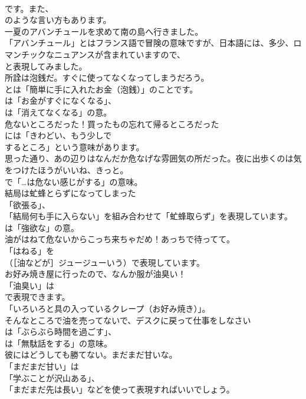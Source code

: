 \documentclass[8pt]{extreport}
\begin{document}
\begin{CJK}{UTF8}{min}
\\	です。また、
\\	のような言い方もあります。	
\\	一夏のアバンチュールを求めて南の島へ行きました。 
\\	「アバンチュール」とはフランス語で冒険の意味ですが、日本語には、多少、ロマンチックなニュアンスが含まれていますので、
\\	と表現してみました。	
\\	所詮は泡銭だ。すぐに使ってなくなってしまうだろう。 
\\	とは「簡単に手に入れたお金（泡銭）」のことです。
\\	は「お金がすぐになくなる」、
\\	は「消えてなくなる」の意。	
\\	危ないところだった！買ったもの忘れて帰るところだった 
\\	には「きわどい、もう少しで 
\\	するところ」という意味があります。	
\\	思った通り、あの辺りはなんだか危なげな雰囲気の所だった。夜に出歩くのは気をつけたほうがいいね、きっと。 
\\	で「…は危ない感じがする」の意味。	
\\	結局は虻蜂とらずになってしまった 
\\	「欲張る」、
\\	「結局何も手に入らない」を組み合わせて「虻蜂取らず」を表現しています。
\\	は「強欲な」の意。	
\\	油がはねて危ないからこっち来ちゃだめ！あっちで待ってて。 
\\	「はねる」を 
\\	（［油などが］ジュージューいう）で表現しています。	
\\	お好み焼き屋に行ったので、なんか服が油臭い！ 
\\	「油臭い」は
\\	で表現できます。
\\	「いろいろと具の入っているクレープ（お好み焼き）」。	
\\	そんなところで油を売ってないで、デスクに戻って仕事をしなさい 
\\	は「ぶらぶら時間を過ごす」、
\\	は「無駄話をする」の意味。	
\\	彼にはどうしても勝てない。まだまだ甘いな。 
\\	「まだまだ甘い」は
\\	「学ぶことが沢山ある」、
\\	「まだまだ先は長い」などを使って表現すればいいでしょう。

\end{CJK}
\end{document}
